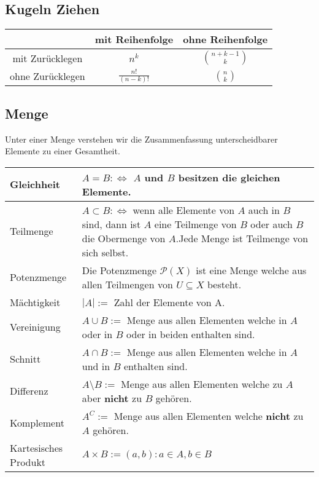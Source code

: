 \documentclass[12pt]{article}
\begin{document}
\subsection{Kugeln Ziehen}
\begin{table}[H]
	\centering
	\begin{tabular}{|c||c|c|}
		\hline
		 & mit Reihenfolge & ohne Reihenfolge\\\hline
		mit Zurücklegen & $n^k$ & ${n+k-1 \choose k}$\\\hline
		ohne Zurücklegen & $\frac{n!}{(n-k)!}$ & ${n \choose k}$\\\hline
	\end{tabular}
\end{table}

\subsection{Menge}
Unter einer Menge verstehen wir die Zusammenfassung unterscheidbarer Elemente zu einer Gesamtheit.
\begin{table}[H]
	\centering
	\begin{tabular}{|l|p{}|}
		\hline
		Gleichheit & $A = B:\Leftrightarrow$ $A$ und $B$ besitzen die gleichen Elemente.\\\hline
		Teilmenge & $A \subset B:\Leftrightarrow$ wenn alle Elemente von $A$ auch in $B$ sind, dann ist $A$ eine Teilmenge von $B$ oder auch $B$ die Obermenge von $A$.\newline Jede Menge ist Teilmenge von sich selbst.\\\hline
		Potenzmenge & Die Potenzmenge $\mathcal{P}(X)$ ist eine Menge welche aus allen Teilmengen von $U \subseteq X$ besteht.\\\hline
		Mächtigkeit & $|A|:=$ Zahl der Elemente von A.\\\hline
		Vereinigung & $A\cup B:=$ Menge aus allen Elementen welche in $A$ oder in $B$ oder in beiden enthalten sind.\\\hline
		Schnitt & $A\cap B:=$ Menge aus allen Elementen welche in $A$ und in $B$ enthalten sind.\\\hline
		Differenz & $A\setminus B:=$ Menge aus allen Elementen welche zu $A$ aber \textbf{nicht} zu $B$ gehören.\\\hline
		Komplement & $A^C:=$ Menge aus allen Elementen welche \textbf{nicht} zu $A$ gehören.\\\hline
		Kartesisches Produkt & \(\displaystyle A \times B:={(a, b):a\in A, b\in B}\)\\\hline
	\end{tabular}
\end{table}
\end{document}
